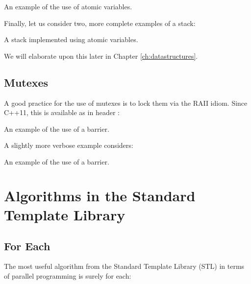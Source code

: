 \begin{itemize}
\begin{end}
\raggedbottom
\begin{codebox}[]{\href{https://godbolt.org/z/}{\ExternalLink}}
\footnotesize An example of the use of atomic variables.
\tcblower
{}
\end{codebox}

Finally, let us consider two, more complete examples of a stack:

\raggedbottom
\begin{codebox}[]{\href{https://godbolt.org/z/}{\ExternalLink}}
\footnotesize A stack implemented using atomic variables.
\tcblower
{}
\end{codebox}

We will elaborate upon this later in Chapter \ref{ch:datastructures}. 

\subsection{Mutexes}

A good practice for the use of mutexes is to lock them via the RAII idiom. Since C++11, this is available as  in header :

\raggedbottom
\begin{codebox}[]{\href{https://godbolt.org/z/}{\ExternalLink}}
\footnotesize An example of the use of a barrier.
\tcblower
{}
\end{codebox}

A slightly more verbose example considers:

\raggedbottom
\begin{codebox}[]{\href{https://godbolt.org/z/}{\ExternalLink}}
\footnotesize An example of the use of a barrier.
\tcblower
{}
\end{codebox}

\section{Algorithms in the Standard Template Library}

\subsection{For Each}
\label{sec:foreachcpp23}

The most useful algorithm from the Standard Template Library (STL) in terms of parallel programming is surely for each:


\end{end}
\end{itemize}
